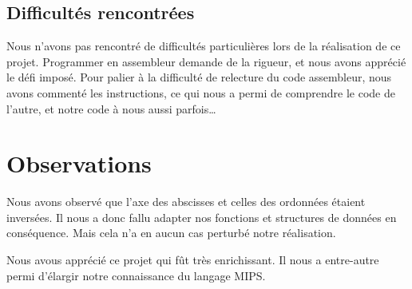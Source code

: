 \documentclass[a4paper]{article}
\begin{document}
\subsection{Difficultés rencontrées}
Nous n'avons pas rencontré de difficultés particulières lors de la réalisation de ce projet. Programmer en assembleur demande de la rigueur, et nous avons apprécié le défi imposé.
Pour palier à la difficulté de relecture du code assembleur, nous avons commenté les instructions, ce qui nous a permi de comprendre le code de l'autre, et notre code à nous aussi parfois\dots

\section{Observations}
Nous avons observé que l'axe des abscisses et celles des ordonnées étaient inversées. Il nous a donc fallu adapter nos fonctions et structures de données en conséquence.
Mais cela n'a en aucun cas perturbé notre réalisation.

Nous avous apprécié ce projet qui fût très enrichissant. Il nous a entre-autre permi d'élargir notre connaissance du langage MIPS.
\end{document}
